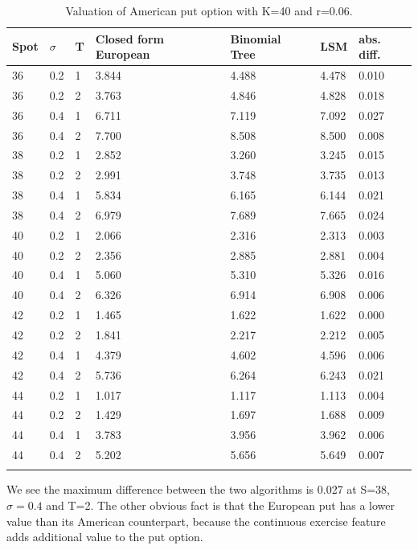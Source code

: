 \begin{table}[th]
\caption{Valuation of American put option with K=40 and r=0.06.}
\label{tab:treatments}
\centering
\begin{tabular}{l l l l l l l }
\toprule
\textbf{Spot} & \textbf{$\sigma$} & \textbf{T} & \textbf{Closed form European} & \textbf{Binomial Tree} & \textbf{LSM} & \textbf{abs. diff.} \\
\midrule
36 & 0.2 & 1 & 3.844 & 4.488 & 4.478 & 0.010\\
36 & 0.2 & 2 & 3.763 & 4.846 & 4.828 & 0.018\\
36 & 0.4 & 1 & 6.711 & 7.119 & 7.092 & 0.027\\
36 & 0.4 & 2 & 7.700 & 8.508 & 8.500 & 0.008\\
38 & 0.2 & 1 & 2.852 & 3.260 & 3.245 & 0.015\\
38 & 0.2 & 2 & 2.991 & 3.748 & 3.735 & 0.013\\
38 & 0.4 & 1 & 5.834 & 6.165 & 6.144 & 0.021\\
38 & 0.4 & 2 & 6.979 & 7.689 & 7.665 & 0.024\\
40 & 0.2 & 1 & 2.066 & 2.316 & 2.313 & 0.003\\
40 & 0.2 & 2 & 2.356 & 2.885 & 2.881 & 0.004\\
40 & 0.4 & 1 & 5.060 & 5.310 & 5.326 & 0.016\\
40 & 0.4 & 2 & 6.326 & 6.914 & 6.908 & 0.006\\
42 & 0.2 & 1 & 1.465 & 1.622 & 1.622 & 0.000\\
42 & 0.2 & 2 & 1.841 & 2.217 & 2.212 & 0.005\\
42 & 0.4 & 1 & 4.379 & 4.602 & 4.596 & 0.006\\
42 & 0.4 & 2 & 5.736 & 6.264 & 6.243 & 0.021\\
44 & 0.2 & 1 & 1.017 & 1.117 & 1.113 & 0.004\\
44 & 0.2 & 2 & 1.429 & 1.697 & 1.688 & 0.009\\
44 & 0.4 & 1 & 3.783 & 3.956 & 3.962 & 0.006\\
44 & 0.4 & 2 & 5.202 & 5.656 & 5.649 & 0.007\\
\bottomrule\\
\end{tabular}
\end{table}
We see the maximum difference between the two algorithms is 0.027 at S=38, $\sigma=0.4$ and T=2. The other obvious fact is that the European put has a lower value than its American counterpart, because the continuous exercise feature adds additional value to the put option. 


